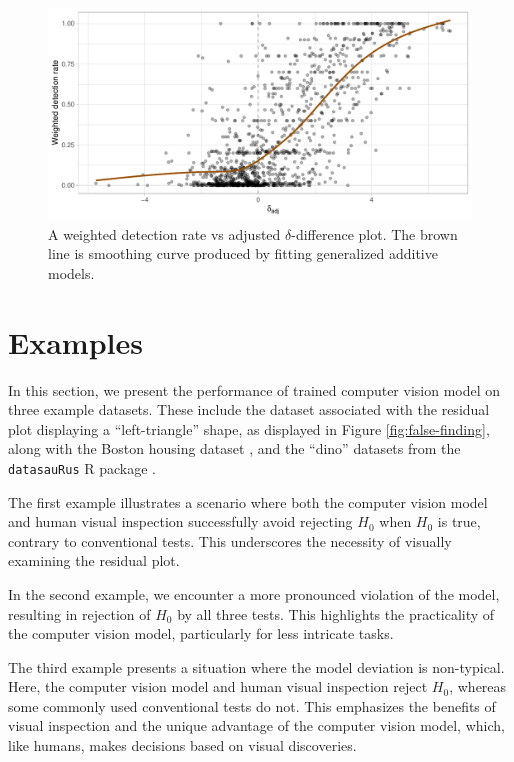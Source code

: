 \documentclass[]{interact}
\theoremstyle{plain}%
\theoremstyle{definition}
\theoremstyle{remark}
\begin{document}
\begin{figure}[!h]

{\centering \includegraphics[width=1\linewidth]{paper_files/figure-latex/delta-1} 

}

\caption{A weighted detection rate vs adjusted $\delta$-difference plot. The brown line is smoothing curve produced by fitting generalized additive models.}\label{fig:delta}
\end{figure}

\section{Examples}\label{sec-examples}

In this section, we present the performance of trained computer vision
model on three example datasets. These include the dataset associated
with the residual plot displaying a ``left-triangle'' shape, as
displayed in Figure \ref{fig:false-finding}, along with the Boston
housing dataset \citep{harrison1978hedonic}, and the ``dino'' datasets
from the \texttt{datasauRus} R package \citep{datasaurus}.

The first example illustrates a scenario where both the computer vision
model and human visual inspection successfully avoid rejecting \(H_0\)
when \(H_0\) is true, contrary to conventional tests. This underscores
the necessity of visually examining the residual plot.

In the second example, we encounter a more pronounced violation of the
model, resulting in rejection of \(H_0\) by all three tests. This
highlights the practicality of the computer vision model, particularly
for less intricate tasks.

The third example presents a situation where the model deviation is
non-typical. Here, the computer vision model and human visual inspection
reject \(H_0\), whereas some commonly used conventional tests do not.
This emphasizes the benefits of visual inspection and the unique
advantage of the computer vision model, which, like humans, makes
decisions based on visual discoveries.
\end{document}

